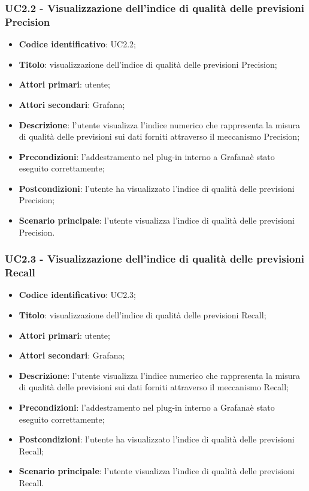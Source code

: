 \subsubsection{UC2.2 - Visualizzazione dell'indice di qualità delle previsioni Precision}
\begin{itemize}
	\item \textbf{Codice identificativo}: UC2.2;
	\item \textbf{Titolo}: visualizzazione dell'indice di qualità delle previsioni Precision\glo;
	\item \textbf{Attori primari}: utente;
	\item \textbf{Attori secondari}: Grafana\glo;
	\item \textbf{Descrizione}: l'utente visualizza l'indice numerico che rappresenta la misura di qualità delle previsioni sui dati forniti attraverso il meccanismo Precision\glo;
	\item \textbf{Precondizioni}: l'addestramento nel plug-in interno a Grafana\glosp è stato eseguito correttamente;
	\item \textbf{Postcondizioni}: l'utente ha visualizzato l'indice di qualità delle previsioni Precision\glo;
	\item \textbf{Scenario principale}: l'utente visualizza l'indice di qualità delle previsioni Precision\glo.
\end{itemize} 
\subsubsection{UC2.3 - Visualizzazione dell'indice di qualità delle previsioni Recall}
\begin{itemize}
	\item \textbf{Codice identificativo}: UC2.3;
	\item \textbf{Titolo}: visualizzazione dell'indice di qualità delle previsioni Recall\glo;
	\item \textbf{Attori primari}: utente;
	\item \textbf{Attori secondari}: Grafana\glo;
	\item \textbf{Descrizione}: l'utente visualizza l'indice numerico che rappresenta la misura di qualità delle previsioni sui dati forniti attraverso il meccanismo Recall\glo;
	\item \textbf{Precondizioni}: l'addestramento nel plug-in interno a Grafana\glosp è stato eseguito correttamente;
	\item \textbf{Postcondizioni}: l'utente ha visualizzato l'indice di qualità delle previsioni Recall\glo;
	\item \textbf{Scenario principale}: l'utente visualizza l'indice di qualità delle previsioni Recall\glo.
\end{itemize} 
